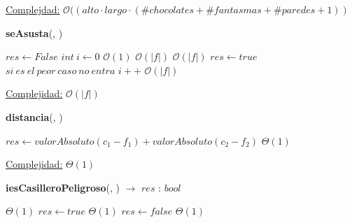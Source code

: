 \documentclass[10pt, a4paper]{article}
\newcommand{\bigO}{\mathcal{O}}
\begin{document}
\begin{Algoritmos}
\begin{algorithm}[H]
\begin{algorithmic}[1]
                \medskip
                \Statex
                \underline{Complejdad:} $\bigO((alto \cdot largo \cdot (\#chocolates + \#fantasmas + \#paredes + 1))$
            \end{algorithmic}
        \end{algorithm}

        \newpage

        \begin{algorithm}[H]{\textbf{seAsusta}(, )}
            \begin{algorithmic}[1]
                    \State $res\gets False$
                    \State $int\ i \gets 0$                               \Comment $\bigO(1)$
                                        \Comment $\bigO(|f|)$
                                                                               \Comment $\bigO(|f|)$
                    \State $res\gets true$                                     \Comment $si\ es \ el \ peor\ caso \ no \ entra$
                    \Else
                    \State $i++ $ 
                    \Comment $\bigO(|f|)$
                    \EndIf
                    \EndWhile
                    
                
                
                \medskip
                \Statex \underline{Complejidad:} $\bigO(|f|)$
            \end{algorithmic}
        \end{algorithm}
        
        \begin{algorithm}[H]{\textbf{distancia}(, )}
            \begin{algorithmic}[1]
                \State $res \gets valorAbsoluto(c_1 - f_1) +  valorAbsoluto(c_2 - f_2)$                                                                 \Comment $\Theta(1)$
                
                \medskip
                \Statex \underline{Complejidad:} $\Theta(1)$
            \end{algorithmic}
        \end{algorithm}
        
        \begin{algorithm}[H]{\textbf{iesCasilleroPeligroso}(, ) $\to$ $res$ : $bool$}
            \begin{algorithmic}[1]
                                                                           \Comment $\Theta(1)$
                \State $res\gets true$                                     \Comment $\Theta(1)$
                \Else
                \State $res\gets false $ 
                \Comment $\Theta(1)$
                \EndIf
            

\end{algorithmic}
\end{algorithm}
\end{Algoritmos}
\end{document}
